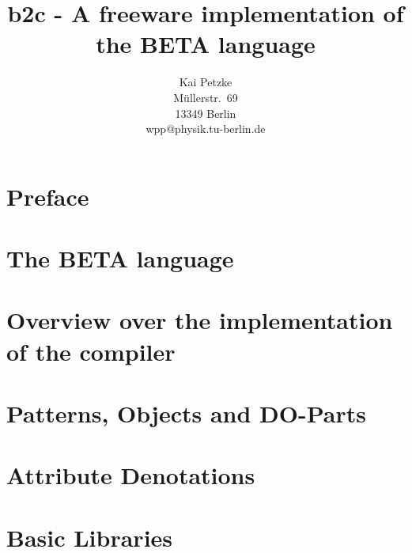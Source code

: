 

\title{b2c - A freeware implementation of the BETA language}
\author{Kai Petzke \\ M\"ullerstr.\ 69 \\ 13349 Berlin \\
        wpp@physik.tu-berlin.de}


\maketitle

\chapter*{Preface}


\chapter{The BETA language}


\chapter[Overview over the implementation]{Overview
over the implementation of the compiler}


\chapter{Patterns, Objects and DO-Parts}




\chapter{Attribute Denotations}




\chapter{Basic Libraries}




